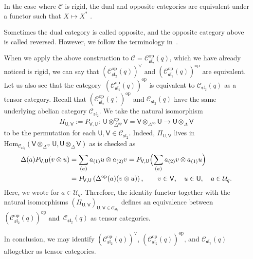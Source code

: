 \documentclass[10pt,a4paper]{amsart}
\numberwithin{equation}{section}
\newcommand{\Hom}{\mathrm{Hom}}
\newcommand{\Id}{\operatorname{Id}}
\newcommand{\op}{\mathrm{op}}
\newcommand{\cC}{\mathcal{C}}
\newcommand{\cU}{\mathcal{U}}
\newcommand{\fsl}{\mathfrak{sl}}
\newcommand{\sfU}{\mathsf{U}}
\newcommand{\sfV}{\mathsf{V}}
\newcommand{\UEA}{\cU}
\newcommand{\Uq}{\UEA_{q}}
\newcommand{\QGcoprod}{\Delta}
\newcommand{\catQG}{\cC_{\fsl_{2}}}
\newcommand{\catgen}{\cC}
\newcommand{\QGrepU}{\sfU}
\newcommand{\QGrepV}{\sfV}
\begin{document}
In the case where $\catgen$ is rigid, the dual and opposite categories are equivalent under a functor such that $X\mapsto X^{*}$ \cite[Chapter 2]{etingof2015tensor}.

\begin{rem}
Sometimes the dual category is called opposite, and the opposite category above is called reversed.
However, we follow the terminology in~\cite{etingof2015tensor}.
\end{rem}

When we apply the above construction to $\catgen=\catQG^{\op}(q)$, which we have already noticed is rigid, we can say that $(\catQG^{\op}(q))^{\vee}$ and $(\catQG^{\op}(q))^{\op}$ are equivalent.
Let us also see that the category~$(\catQG^{\op}(q))^{\op}$ is equivalent to $\catQG (q)$ as a tensor category.
Recall that $(\catQG^{\op}(q))^{\op}$ and $\catQG(q)$ have the same underlying abelian category $\catQG$.
We take the natural isomorphism
\begin{gather*}
 \Pi_{\QGrepU,\QGrepV}:=P_{\QGrepV,\QGrepU}\colon\ \QGrepU\otimes_{\QGcoprod^{\op}}^{\op}\QGrepV= \QGrepV\otimes_{\QGcoprod^{\op}}\QGrepU\to \QGrepU\otimes_{\QGcoprod}\QGrepV
\end{gather*}
to be the permutation for each $\QGrepU,\QGrepV\in \catQG$.
Indeed, $\Pi_{\QGrepU,\QGrepV}$ lives in $\Hom_{\catQG}(\QGrepV\otimes_{\QGcoprod^{\op}}\QGrepU,\QGrepU\otimes_{\QGcoprod}\QGrepV)$ as is checked as
\begin{align*}
 \QGcoprod (a)P_{\QGrepV,\QGrepU}(v\otimes u)&=\sum_{(a)}a_{(1)}u\otimes a_{(2)}v =P_{\QGrepV,\QGrepU}\Bigl(\sum_{(a)}a_{(2)}v\otimes a_{(1)}u\Bigr) \\
 &=P_{\QGrepV,\QGrepU}\left(\QGcoprod^{\op}(a)(v\otimes u)\right),\qquad v\in \QGrepV,\quad u\in \QGrepU,\quad a\in \Uq.
\end{align*}
Here, we wrote \smash{$\QGcoprod (a)=\sum_{(a)}a_{(1)}\otimes a_{(2)}$} for $a\in \Uq$.
Therefore, the identity functor \smash{$\Id_{\catQG}$} together with the natural isomorphisms $(\Pi_{\QGrepU,\QGrepV})_{\QGrepU,\QGrepV\in \catQG}$ defines an equivalence between $(\catQG^{\op}(q))^{\op}$ and~$\catQG (q)$ as tensor categories.

In conclusion, we may identify $(\catQG^{\op}(q))^{\vee}$, $(\catQG^{\op}(q))^{\op}$, and $\catQG(q)$ altogether as tensor categories.
\end{document}
